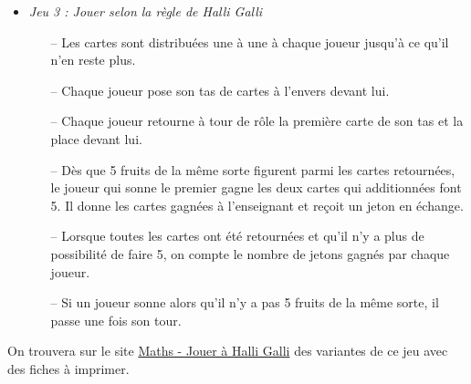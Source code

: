 \begin{exercice*}
\begin{description}
\begin{itemize}
      \item {\it Jeu 3 : Jouer selon la règle de Halli Galli}
         \begin{itemize}
            \item[--] Les cartes sont distribuées une à une à chaque joueur jusqu’à ce qu’il n’en reste plus.
            \item[--] Chaque joueur pose son tas de cartes à l’envers devant lui.
            \item[--] Chaque joueur retourne à tour de rôle la première carte de son tas et la place devant lui.
            \item[--] Dès que 5 fruits de la même sorte figurent parmi les cartes retournées, le joueur qui sonne le premier gagne les deux cartes qui additionnées font 5. Il donne les cartes gagnées à l’enseignant et reçoit un jeton en échange.
            \item[--] Lorsque toutes les cartes ont été retournées et qu’il n’y a plus de possibilité de faire 5, on compte le nombre de jetons gagnés par chaque joueur.
            \item[--] Si un joueur sonne alors qu’il n’y a pas 5 fruits de la même sorte, il passe une fois son tour. \medskip
         \end{itemize}
      \end{itemize}
   \end{description}
   On trouvera sur le site \href{http://www.pedagogieautisme.fr/2018/02/jouer-a-halli-galli-activites-preparatoires-et-regle-du-jeu-modifiees.html}{\blue Maths - Jouer à Halli Galli} des variantes de ce jeu avec des fiches à imprimer.
   \begin{center}

\end{center}
\end{exercice*}
